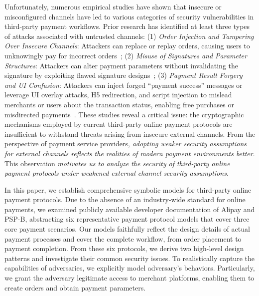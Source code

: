 Unfortunately, numerous empirical studies have shown that insecure or misconfigured channels have led to various categories of security vulnerabilities in third-party payment workflows.
Prior research has identified at least three types of attacks associated with untrusted channels:
(1) \emph{Order Injection and Tampering Over Insecure Channels}: 
Attackers can replace or replay orders, causing users to unknowingly pay for incorrect orders~\cite{Sun2014DetectingECommerce, Yang2017FlawedImplementations};
(2) \emph{Misuse of Signatures and Parameter Structures}: 
Attackers can alter payment parameters without invalidating the signature by exploiting flawed signature designs~\cite{Lou2021PaymentVulnerabilities};
(3) \emph{Payment Result Forgery and UI Confusion}: 
Attackers can inject forged ``payment success'' messages or leverage UI overlay attacks, H5 redirection, and script injection to mislead merchants or users about the transaction status, enabling free purchases or misdirected payments~\cite{Ulqinaku2019ScanAndPayAndroid, Yang2017FlawedImplementations}.
These studies reveal a critical issue: the cryptographic mechanisms employed by current third-party online payment protocols are insufficient to withstand threats arising from insecure external channels.
From the perspective of payment service providers, \emph{adopting weaker security assumptions for external channels reflects the realities of modern payment environments better}.
This observation \emph{motivates us to analyze the security of third-party online payment protocols under weakened external channel security assumptions}.

In this paper, we establish comprehensive symbolic models for third-party online payment protocols.
Due to the absence of an industry-wide standard for online payments, we examined publicly available developer documentation of Alipay\cite{Alipay2025OpenPlatform} and PSP-B,
abstracting six representative payment protocol models that cover three core payment scenarios.
Our models faithfully reflect the design details of actual payment processes and cover the complete workflow, from order placement to payment completion.
From these six protocols, we derive two high-level design patterns and investigate their common security issues.
To realistically capture the capabilities of adversaries, we explicitly model adversary's behaviors.
Particularly, we grant the adversary legitimate access to merchant platforms, enabling them to create orders and obtain payment parameters.

